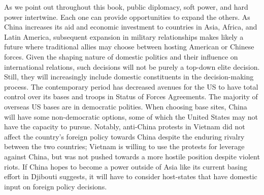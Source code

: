 As we point out throughout this book, public diplomacy, soft power, and hard power intertwine. Each one can provide opportunities to expand the others. As China increases its aid and economic investment to countries in Asia, Africa, and Latin America, subsequent expansion in military relationships makes likely a future where traditional allies may choose between hosting American or Chinese forces. Given the shaping nature of domestic politics and their influence on international relations, such decisions will not be purely a top-down elite decision. Still, they will increasingly include domestic constituents in the decision-making process. The contemporary period has decreased avenues for the US to have total control over its bases and troops in Status of Forces Agreements. The majority of overseas US bases are in democratic polities. When choosing base sites, China will have some non-democratic options, some of which the United States may not have the capacity to pursue. Notably, anti-China protests in Vietnam did not affect the country's foreign policy towards China despite the enduring rivalry between the two countries; Vietnam is willing to use the protests for leverage against China, but was not pushed towards a more hostile position despite violent riots.\autocite{Hoang2019} If China hopes to become a power outside of Asia like its current basing effort in Djibouti suggests, it will have to consider host-states that have domestic input on foreign policy decisions. 

